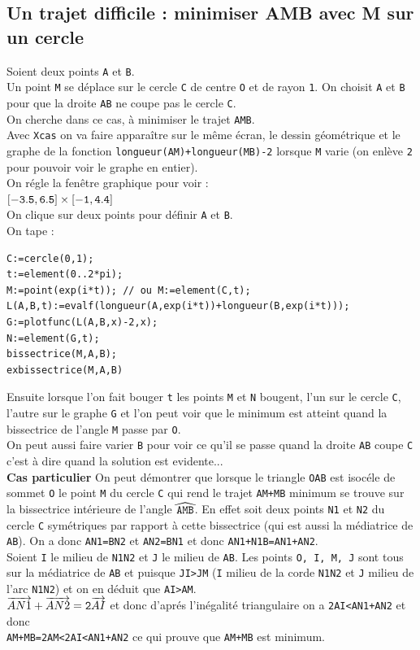 \documentclass[a4paper,11pt]{book}
\begin{document}
\subsection{Un trajet difficile : minimiser AMB  avec M sur un cercle}
Soient deux points {\tt A} et {\tt B}.\\
Un point {\tt M} se d\'eplace sur le cercle  {\tt C} de centre {\tt O} et de 
rayon {\tt 1}. On choisit {\tt A} et {\tt B} pour que la droite {\tt AB}
ne coupe pas le cercle {\tt C}.\\
On cherche dans ce cas, \`a minimiser le trajet {\tt AMB}.\\ 
Avec {\tt Xcas} on va faire appara\^{i}tre sur le m\^eme \'ecran, le dessin 
g\'eom\'etrique et le graphe de la fonction {\tt longueur(AM)+longueur(MB)-2}
lorsque {\tt M} varie (on enl\`eve {\tt 2} pour pouvoir voir 
le graphe en entier).\\
On r\'egle la fen\^etre graphique pour voir :\\
${\tt [-3.5,6.5] \times [-1,4.4] }$\\
On clique sur deux points pour d\'efinir {\tt A} et {\tt B}.\\
On tape :\\
\begin{verbatim}
C:=cercle(0,1);
t:=element(0..2*pi);
M:=point(exp(i*t)); // ou M:=element(C,t);
L(A,B,t):=evalf(longueur(A,exp(i*t))+longueur(B,exp(i*t)));
G:=plotfunc(L(A,B,x)-2,x);
N:=element(G,t);
bissectrice(M,A,B);
exbissectrice(M,A,B)
\end{verbatim}
Ensuite lorsque l'on fait bouger {\tt t} les points {\tt M} et {\tt N} bougent,
l'un sur le cercle {\tt C}, l'autre sur le graphe {\tt G} et l'on peut voir que
le minimum est atteint quand la bissectrice de l'angle {\tt M} passe par 
{\tt O}.\\
On peut aussi faire varier {\tt B} pour voir ce qu'il se passe quand la droite 
{\tt AB} coupe {\tt C} c'est \`a dire quand la solution est evidente...\\
{\bf Cas particulier}
On peut d\'emontrer que lorsque le triangle {\tt OAB} est isoc\'ele de sommet 
{\tt O} le point {\tt M} du cercle {\tt C} qui rend le trajet {\tt AM+MB} 
minimum se trouve sur la bissectrice int\'erieure de l'angle 
${\tt \widehat{AMB}}$. En effet soit deux points {\tt N1} et {\tt N2}
du cercle {\tt C} sym\'etriques par rapport \`a cette bissectrice (qui est 
aussi la m\'ediatrice de {\tt AB}). On a donc {\tt AN1=BN2} et {\tt AN2=BN1} 
et donc {\tt AN1+N1B=AN1+AN2}.\\
Soient {\tt I} le milieu de {\tt N1N2} et {\tt J} le milieu de {\tt AB}.
Les points  {\tt O, I, M, J} sont tous sur la m\'ediatrice de {\tt AB} et 
puisque  {\tt JI>JM} ({\tt I} milieu de la corde {\tt N1N2} et 
 {\tt J} milieu de l'arc {\tt N1N2}) et on en d\'eduit que {\tt AI>AM}.\\
${\tt \overrightarrow{AN1} +\overrightarrow{AN2}=2\overrightarrow{AI}}$ et 
donc d'apr\'es l'in\'egalit\'e triangulaire on a {\tt 2AI<AN1+AN2} et donc \\
{\tt AM+MB=2AM<2AI<AN1+AN2} ce qui prouve que {\tt AM+MB} est minimum.
\end{document}
